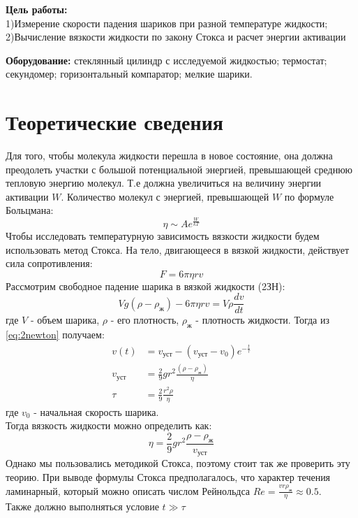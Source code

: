 \textbf{Цель работы:} \\
1)Измерение скорости падения шариков при разной температуре жидкости;\\ 
2)Вычисление вязкости жидкости по закону Стокса и расчет энергии активации\\\indent

\textbf{Оборудование:} стеклянный цилиндр с исследуемой жидкостью; термостат;
секундомер; горизонтальный компаратор; мелкие шарики. 

\section*{Теоретические сведения}
\indent 
Для того, чтобы молекула жидкости перешла в новое состояние, она 
должна преодолеть участки с большой потенциальной энергией, 
превышающей среднюю тепловую энергию молекул. Т.е должна увеличиться 
на величину энергии активации $W$. Количество молекул с энергией, 
превышающей $W$ по формуле Больцмана:
\begin{equation}
    \eta \sim Ae^{\frac{W}{kT}}
\end{equation}
\indent
Чтобы исследовать температурную зависимость вязкости жидкости будем 
использовать метод Стокса. На тело, двигающееся в вязкой жидкости, 
действует сила сопротивления:
\begin{equation}
    F = 6\pi\eta r v
\end{equation}
\indent
Рассмотрим свободное падение шарика в вязкой жидкости (2ЗН):
\begin{equation}
    Vg(\rho - \rho_{\text{ж}}) - 6\pi\eta r v = V\rho \frac{dv}{dt} \label{eq:2newton}
\end{equation}
где $V$ - объем шарика, $\rho$ - его плотность, $\rho_{\text{ж}}$ - 
плотность жидкости. Тогда из \ref{eq:2newton} получаем:
\begin{align}
    v(t) &= v_{\text{уст}} - (v_{\text{уст}} - v_0) e^{-\frac{t}{\tau}}\\ 
    v_{\text{уст}} &= \frac{2}{9} g r^2 \frac{(\rho - \rho_{\text{ж}})}{\eta}\\ 
    \tau &= \frac{2}{9}\frac{r^2 \rho}{\eta}
\end{align}
где $v_0$ - начальная скорость шарика.\\
Тогда вязкость жидкости можно определить как:
\begin{equation}
    \eta = \frac{2}{9} g r^2 \frac{\rho - \rho_{\text{ж}}}{v_{\text{уст}}}
\end{equation}
Однако мы пользовались методикой Стокса, поэтому стоит так же проверить 
эту теорию. При выводе формулы Стокса предполагалось, что характер 
течения ламинарный, который можно описать числом Рейнольдса 
$Re = \frac{v r \rho_{\text{ж}}}{\eta} \approx 0.5$. \\ 
Также должно выполняться условие $t \gg \tau$

